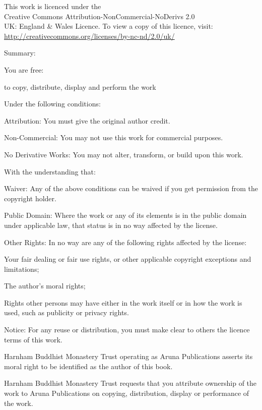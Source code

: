 
\newpage
\thispagestyle{plain}

{\ccdetailssize\setlength{\parindent}{0em}%
\raggedright

\label{cc-details}
{\centering

{\large\ccbyncnd}
\bigskip

This work is licenced under the\\ Creative Commons Attribution-NonCommercial-NoDerivs 2.0\\ UK: England \& Wales Licence. To view a copy of this licence, visit:\\
\href{http://creativecommons.org/licenses/by-nc-nd/2.0/uk/}{http://creativecommons.org/licenses/by-nc-nd/2.0/uk/}

}
\bigskip

Summary:
\bigskip

You are free:

\begin{ccitemize}
\item to copy, distribute, display and perform the work
\end{ccitemize}

Under the following conditions:
\begin{ccitemize}
\item Attribution: You must give the original author credit.
\item Non-Commercial: You may not use this work for commercial purposes.
\item No Derivative Works: You may not alter, transform, or build upon this work.
\end{ccitemize}

With the understanding that:
\begin{ccitemize}
\item Waiver: Any of the above conditions can be waived if you get permission from the copyright holder.
\item Public Domain: Where the work or any of its elements is in the public domain under applicable law, that status is in no way affected by the license.
\item Other Rights: In no way are any of the following rights affected by the license:
\begin{ccitemize}
\item Your fair dealing or fair use rights, or other applicable copyright exceptions and limitations;
\item The author's moral rights;
\item Rights other persons may have either in the work itself or in how the work is used, such as publicity or privacy rights.
\end{ccitemize}
\item Notice: For any reuse or distribution, you must make clear to others the licence terms of this work.
\end{ccitemize}

Harnham Buddhist Monastery Trust operating as Aruna Publications asserts its moral right to be identified as the author of this book.
\bigskip

Harnham Buddhist Monastery Trust requests that you attribute ownership of the work to Aruna Publications on copying, distribution, display or performance of the work.

}

